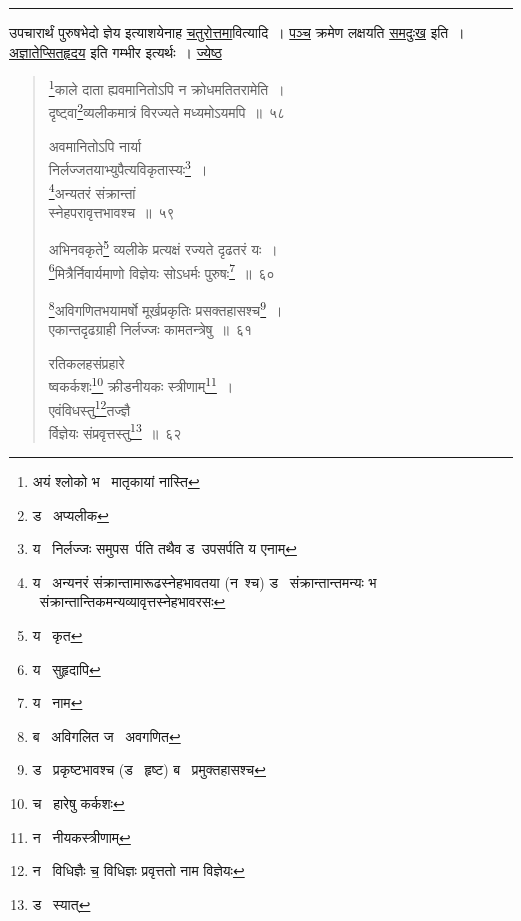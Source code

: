 \documentclass[11pt, openany]{book}
\begin{document}
\hrule

\vspace{2mm}
उपचारार्थं पुरुषभेदो ज्ञेय इत्याशयेनाह \underline{चतुरोत्तमा}वित्यादि~। \underline{पञ्च} क्रमेण लक्षयति \underline{समदुःख} इति~। \underline{अज्ञातेप्सितहृदय} इति गम्भीर इत्यर्थः~। \underline{ज्येष्ठ}

\newpage

\begin{quote}
{\na \renewcommand{\thefootnote}{1}\footnote{अयं श्लोको भ \textendash\  मातृकायां नास्ति}काले दाता ह्यवमानितोऽपि न क्रोधमतितरामेति~।\\
दृष्ट्वा\renewcommand{\thefootnote}{2}\footnote{ड \textendash\  अप्यलीक}व्यलीकमात्रं विरज्यते मध्यमोऽयमपि~॥~५८ 

अवमानितोऽपि नार्या\\
निर्लज्जतयाभ्युपैत्यविकृतास्यः\renewcommand{\thefootnote}{3}\footnote{य \textendash\  निर्लज्जः समुपस\textendash\ र्पति तथैव ड\textendash\ उपसर्पति य एनाम्}~।\\
\renewcommand{\thefootnote}{4}\footnote{य \textendash\  अन्यनरं संक्रान्तामारूढस्नेहभावतया (न\textendash\ श्च) ड \textendash\  संक्रान्तान्तमन्यः भ \textendash\  संक्रान्तान्तिकमन्यव्यावृत्तस्नेहभावरसः}अन्यतरं संक्रान्तां\\
स्नेहपरावृत्तभावश्च~॥~५९

अभिनवकृते\renewcommand{\thefootnote}{5}\footnote{य \textendash\  कृत} व्यलीके प्रत्यक्षं रज्यते दृढतरं यः~।\\
\renewcommand{\thefootnote}{6}\footnote{य \textendash\  सुहृदापि}मित्रैर्निवार्यमाणो विज्ञेयः सोऽधर्मः पुरुषः\renewcommand{\thefootnote}{7}\footnote{य \textendash\  नाम}~॥~६०

\renewcommand{\thefootnote}{8}\footnote{ब \textendash\  अविगलित ज \textendash\  अवगणित}अविगणितभयामर्षो मूर्खप्रकृतिः प्रसक्तहासश्च\renewcommand{\thefootnote}{9}\footnote{ड \textendash\  प्रकृष्टभावश्च (ड \textendash\  हृष्ट) ब \textendash\  प्रमुक्तहासश्च}~।\\
एकान्तदृढग्राही निर्लज्जः कामतन्त्रेषु~॥~६१

रतिकलहसंप्रहारे\textendash \\
ष्वकर्कशः\renewcommand{\thefootnote}{10}\footnote{च \textendash\  हारेषु कर्कशः} क्रीडनीयकः स्त्रीणाम्\renewcommand{\thefootnote}{11}\footnote{न \textendash\  नीयकस्त्रीणाम्}~। \\
एवंविधस्तु\renewcommand{\thefootnote}{12}\footnote{न \textendash\  विधिज्ञैः च॒ विधिज्ञः प्रवृत्ततो नाम विज्ञेयः}तज्ज्ञै \\
र्विज्ञेयः संप्रवृत्तस्तु\renewcommand{\thefootnote}{13}\footnote{ड \textendash\  स्यात्}~॥~६२}
\end{quote}
\end{document}
